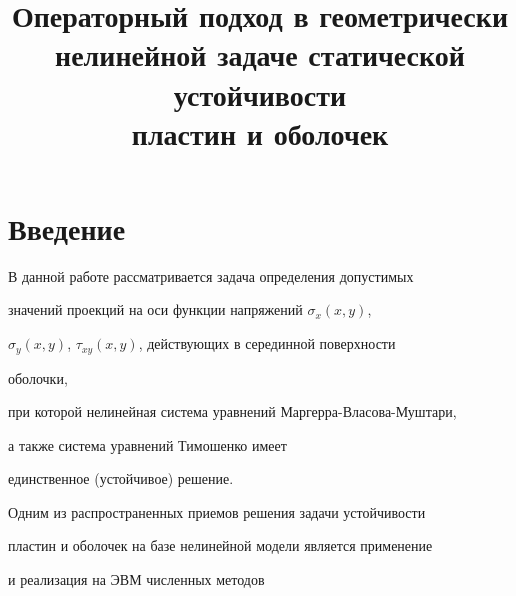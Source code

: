 

\title{Операторный подход в геометрически\\ 


нелинейной задаче статической устойчивости\\ 


пластин и оболочек}  


  


\date{}  




  


\pagestyle{plain} %


  


  




  


\maketitle  


 


\section*{Введение} 


В данной работе рассматривается задача определения допустимых 


значений проекций на оси функции напряжений $\sigma_x(x,y)$, 


$\sigma_y(x,y)$, $\tau_{xy}(x,y)$, действующих в серединной поверхности 


оболочки, 


при которой нелинейная система уравнений Маргерра-Власова-Муштари, 


а также система уравнений Тимошенко имеет 


единственное (устойчивое) решение. 


 


Одним из распространенных приемов решения задачи устойчивости 


пластин и оболочек на базе нелинейной модели является применение 


и реализация на ЭВМ численных методов \linebreak


